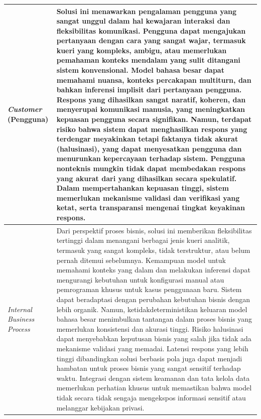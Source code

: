 \begin{longtable}{|p{3.5cm}|p{9cm}|}
\textit{Customer} (Pengguna) & Solusi ini menawarkan pengalaman pengguna yang sangat unggul dalam hal kewajaran interaksi dan fleksibilitas komunikasi. Pengguna dapat mengajukan pertanyaan dengan cara yang sangat wajar, termasuk kueri yang kompleks, ambigu, atau memerlukan pemahaman konteks mendalam yang sulit ditangani sistem konvensional. Model bahasa besar dapat memahami nuansa, konteks percakapan multiturn, dan bahkan inferensi implisit dari pertanyaan pengguna. Respons yang dihasilkan sangat naratif, koheren, dan menyerupai komunikasi manusia, yang meningkatkan kepuasan pengguna secara signifikan. Namun, terdapat risiko bahwa sistem dapat menghasilkan respons yang terdengar meyakinkan tetapi faktanya tidak akurat (halusinasi), yang dapat menyesatkan pengguna dan menurunkan kepercayaan terhadap sistem. Pengguna nonteknis mungkin tidak dapat membedakan respons yang akurat dari yang dihasilkan secara spekulatif. Dalam mempertahankan kepuasan tinggi, sistem memerlukan mekanisme validasi dan verifikasi yang ketat, serta transparansi mengenai tingkat keyakinan respons. \\
\hline

\textit{Internal Business Process} & Dari perspektif proses bisnis, solusi ini memberikan fleksibilitas tertinggi dalam menangani berbagai jenis kueri analitik, termasuk yang sangat kompleks, tidak terstruktur, atau belum pernah ditemui sebelumnya. Kemampuan model untuk memahami konteks yang dalam dan melakukan inferensi dapat mengurangi kebutuhan untuk konfigurasi manual atau pemrograman khusus untuk kasus penggunaan baru. Sistem dapat beradaptasi dengan perubahan kebutuhan bisnis dengan lebih organik. Namun, ketidakdeterministikan keluaran model bahasa besar menimbulkan tantangan dalam proses bisnis yang memerlukan konsistensi dan akurasi tinggi. Risiko halusinasi dapat menyebabkan keputusan bisnis yang salah jika tidak ada mekanisme validasi yang memadai. Latensi respons yang lebih tinggi dibandingkan solusi berbasis pola juga dapat menjadi hambatan untuk proses bisnis yang sangat sensitif terhadap waktu. Integrasi dengan sistem keamanan dan tata kelola data memerlukan perhatian khusus untuk memastikan bahwa model tidak secara tidak sengaja mengekspos informasi sensitif atau melanggar kebijakan privasi. \\
\hline


\end{longtable}
